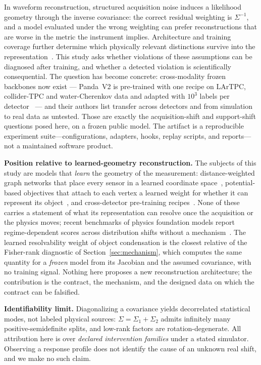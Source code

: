 \documentclass[10pt,twocolumn]{extarticle}
\begin{document}
In waveform reconstruction, structured acquisition noise induces a likelihood
geometry through the inverse covariance: the correct residual weighting is
$\Sigma^{-1}$, and a model evaluated under the wrong weighting can prefer
reconstructions that are worse in the metric the instrument implies.
Architecture and training coverage further determine which physically relevant
distinctions survive into the representation~\cite{paper1}. This study asks
whether violations of these assumptions can be diagnosed after training, and
whether a detected violation is scientifically consequential. The question has
become concrete: cross-modality frozen backbones now exist --- Panda~V2 is
pre-trained with one recipe on LArTPC, collider-TPC and water-Cherenkov data
and adapted with $10^3$ labels per detector~\cite{panda2} --- and their authors
list transfer across detectors and from simulation to real data as untested.
Those are exactly the acquisition-shift and support-shift questions posed
here, on a frozen public model. The artifact is a
reproducible experiment suite---configurations, adapters, hooks, replay
scripts, and reports---not a maintained software product.

\textbf{Position relative to learned-geometry reconstruction.} The subjects
of this study are models that \emph{learn} the geometry of the measurement:
distance-weighted graph networks that place every sensor in a learned
coordinate space~\cite{gravnet}, potential-based objectives that attach to
each vertex a learned weight for whether it can represent its
object~\cite{objcond}, and cross-detector pre-training
recipes~\cite{panda2}. None of these carries a statement of what its
representation can resolve once the acquisition or the physics moves; recent
benchmarks of physics foundation models report regime-dependent scores across
distribution shifts without a mechanism~\cite{fmbench}. The learned
resolvability weight of object condensation is the closest relative of the
Fisher-rank diagnostic of Section~\ref{sec:mechanism}, which computes the same
quantity for a \emph{frozen} model from its Jacobian and the assumed
covariance, with no training signal. Nothing here proposes a new
reconstruction architecture; the contribution is the contract, the mechanism,
and the designed data on which the contract can be falsified.

\textbf{Identifiability limit.} Diagonalizing a covariance yields decorrelated
statistical modes, not labeled physical sources: $\Sigma=\Sigma_1+\Sigma_2$
admits infinitely many positive-semidefinite splits, and low-rank factors are
rotation-degenerate. All attribution here is over \emph{declared intervention
families} under a stated simulator. Observing a response profile does not
identify the cause of an unknown real shift, and we make no such claim.
\end{document}
